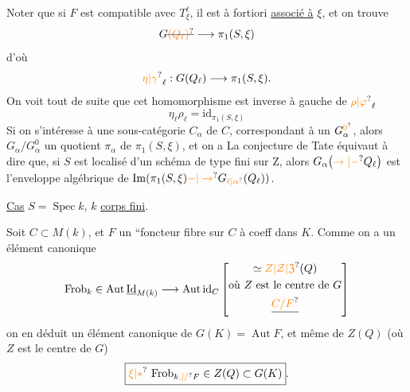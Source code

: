 Noter que si $F$ est compatible avec $T^\ell_\xi$, il est à fortiori \uline{associé à} $\xi$, et on trouve
\[
G\deleted{\unsure{(Q_\ell)}}\longrightarrow\pi_1(S,\xi)
\]
d'où
\[
\unsure{\eta|\gamma}_\ell:G(Q_\ell)\longrightarrow\pi_1(S,\xi).
\]
On voit tout de suite que cet homomorphisme est inverse à gauche de $\unsure{\rho|\varphi}_\ell$
\[
\boxed{\eta_\ell\rho_\ell=\mathrm{id}_{\pi_1(S,\xi)}}
\]
Si on s'intéresse à une sous-catégorie $C_\alpha$ de $C$, correspondant à un $G_\alpha^{\unsure{0}}$, alors $G_\alpha/G_\alpha^0$  un quotient $\pi_\alpha$ de $\pi_1(S,\xi)$, et on a
La conjecture de Tate  équivaut à dire que, si $S$ est localisé d'un schéma de type fini sur $\mathrm Z$, alors $G_\alpha\bigl(\unsure{\to|-}Q_\ell\bigr)$ est l'enveloppe algébrique de $\operatorname{Im}(\pi_1(S,\xi)\unsure{-|\to}G_{\unsure{\ell|\alpha}}(Q_\ell))$.

\uline{Cas} $S=\operatorname{Spec} k$, $k$ \uline{corps fini}.

Soit $C\subset M(k)$, et $F$ un ``foncteur fibre sur $C$ à coeff dans $K$. Comme on a un élément canonique 
\[
\mathrm{Frob}_k\in\operatorname{Aut}\underline{\mathrm{Id}}_{M(k)}\longrightarrow\operatorname{Aut}\mathrm{id}_C
\left[\begin{gathered}\simeq\unsure{Z|\mathcal Z|\mathfrak Z}(Q)\\
\text{où }Z\text{ est le centre de }G\\
\deleted{\unsure{C/F}}
\end{gathered}\right]
\]
on en déduit un élément canonique de $G(K)=\operatorname{Aut}F$, et même de $Z(Q)$ (où $Z$ est le centre de $G$)
\[
\boxed{\unsure{\xi|*}\ \mathrm{Frob}_{k\unsure{,|/}F}\in Z(Q)\subset G(K)}.
\]

